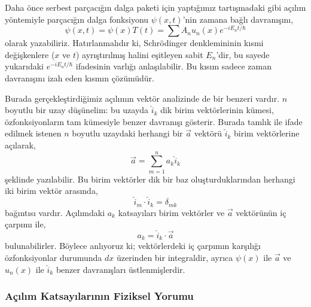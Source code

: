 \documentclass[a4paper,12pt, twoside]{article}
\begin{document}
Daha önce serbest parçacığın dalga paketi için yaptığımız tartışmadaki gibi açılım yöntemiyle parçacığın dalga fonksiyonu $\psi(x,t)$'nin zamana bağlı davranışını,
\begin{equation}
\psi ( x , t ) = \psi ( x ) T(t) = \sum A _ { n } u _ { n } ( x ) e ^ { - i E _ { n } t / \hbar }
\end{equation}
olarak yazabiliriz. Hatırlanmalıdır ki, Schrödinger denklemininin kısmi değişkenlere ($x$ ve $t$) ayrıştırılmış halini eşitleyen sabit $E_n$'dir, bu sayede yukarıdaki $e ^ { - i E _ { n } t / \hbar }$ ifadesinin varlığı anlaşılabilir. Bu kısım sadece zaman davranışını izah eden kısmın çözümüdür.

Burada gerçekleştirdiğimiz açılımın vektör analizinde de bir benzeri vardır. $n$ boyutlu bir uzay düşünelim: bu uzayda $\hat i_k$ dik birim vektörlerinin kümesi, özfonksiyonların tam kümesiyle benzer davranışı gösterir. Burada tamlık ile ifade edilmek istenen $n$ boyutlu uzaydaki herhangi bir $\vec a$ vektörü $\hat i_k$ birim vektörlerine açılarak,
\begin{equation}
\vec a = \sum _ { m = 1 } ^ { n } a _ { k } \hat i _ { k }
\end{equation}
şeklinde yazılabilir. Bu birim vektörler dik bir baz oluşturduklarından herhangi iki birim vektör arasında,
\begin{equation}
\hat i  _ { m } \cdot \hat { i } _ { k } = \delta _ { m k }
\end{equation}
bağıntısı vardır. Açılımdaki $a_k$ katsayıları birim vektörler ve $\vec a$ vektörünün iç çarpımı ile,
\begin{equation}
a _ { k } = \hat i _ { k } \cdot \vec a
\end{equation}
bulunabilirler. Böylece anlıyoruz ki; vektörlerdeki iç çarpımın karşılığı özfonksiyonlar durumunda $dx$ üzerinden bir integraldir, ayrıca  $\psi(x)$ ile $\vec a$ ve $u_n(x)$ ile $\hat i_k$ benzer davranışları üstlenmişlerdir.

\subsubsection{Açılım Katsayılarının Fiziksel Yorumu}
\end{document}
